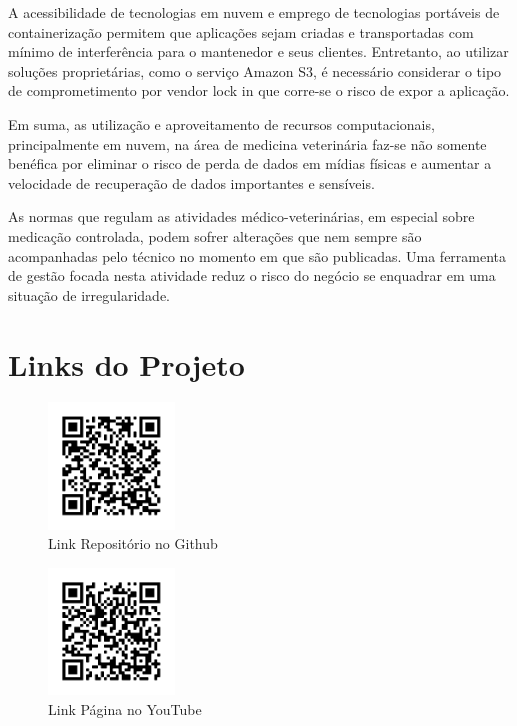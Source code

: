 \documentclass[
    12pt,               %
    openright,          %
    oneside,
    a4paper,            %
    BIBLATEX,           %
    TODO,               %
    english,            %
    brazil              %
    ]{ifsp-spo-inf-ctds}
\begin{document}
    A acessibilidade de tecnologias em nuvem e emprego de tecnologias portáveis de containerização permitem que aplicações sejam criadas e transportadas com mínimo de interferência para o mantenedor e seus clientes. Entretanto, ao utilizar soluções proprietárias, como o serviço Amazon S3, é necessário considerar o tipo de comprometimento por vendor lock in que corre-se o risco de expor a aplicação.

    Em suma, as utilização e aproveitamento de recursos computacionais, principalmente em nuvem, na área de medicina veterinária faz-se não somente benéfica por eliminar o risco de perda de dados em mídias físicas e aumentar a velocidade de recuperação de dados importantes e sensíveis.

    As normas que regulam as atividades médico-veterinárias, em especial sobre medicação controlada, podem sofrer alterações que nem sempre são acompanhadas pelo técnico no momento em que são publicadas. Uma ferramenta de gestão focada nesta atividade reduz o risco do negócio se enquadrar em uma situação de irregularidade.

\chapter[Links do Projeto]{Links do Projeto}
    \begin{figure} [htb!]
        \centering
        \includegraphics[width=0.3\textwidth]{qrcode/qrcode_GIT.png}
        \caption{Link Repositório no Github}
        \label{fig:qrcode_GIT}
    \end{figure}
    
    \begin{figure}[htb!]
        \centering
        \includegraphics [width=0.3\textwidth]{qrcode/qrcode_YT.png}
        \caption{Link Página no YouTube}
        \label{fig:qrcode_YT}
    \end{figure}
    
\end{document}
